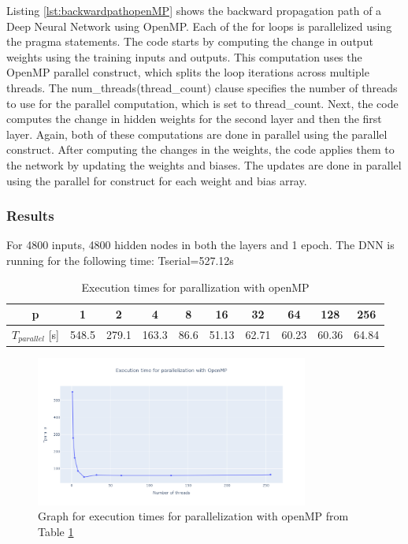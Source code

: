 \documentclass[11pt]{article}
\begin{document}
Listing \ref{lst:backwardpathopenMP} shows the backward propagation path of a Deep Neural Network using OpenMP. Each of the for loops is parallelized using the pragma statements.  The code starts by computing the change in output weights using the training inputs and outputs. This computation uses the OpenMP parallel construct, which splits the loop iterations across multiple threads. The num\_threads(thread\_count) clause specifies the number of threads to use for the parallel computation, which is set to thread\_count. Next, the code computes the change in hidden weights for the second layer and then the first layer. Again, both of these computations are done in parallel using the parallel construct. After computing the changes in the weights, the code applies them to the network by updating the weights and biases. The updates are done in parallel using the parallel for construct for each weight and bias array.

\subsubsection{Results}
For 4800 inputs, 4800 hidden nodes in both the layers and 1 epoch. The DNN is running for the following time:
Tserial=527.12s
\begin{table}[H]
\centering
\begin{tabular}{|c|c|c|c|c|c|c|c|c|c|}
\hline
 p & 1 & 2 & 4 & 8 & 16 & 32 & 64 & 128 & 256 \\ \hline
 $T_{parallel}$ [s] & 548.5 & 279.1 & 163.3 & 86.6 & 51.13 & 62.71 & 60.23 & 60.36 & 64.84 \\ \hline
\end{tabular}
\caption{Execution times for parallization with openMP} \label{timeopenMP}
\end{table}

\begin{figure}[H]
    \centering
    \includegraphics[width=0.8\textwidth]{Plots/exec_openMP.png}
    \caption{Graph for execution times for parallelization with openMP from Table \ref{timeopenMP}}
    \label{fig:exec_openMP}
\end{figure}
\end{document}
